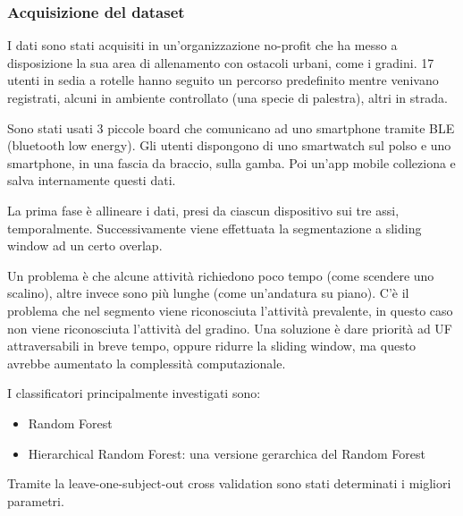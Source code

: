 \subsubsection{Acquisizione del dataset}
I dati sono stati acquisiti in un'organizzazione no-profit che ha messo a disposizione la sua area di allenamento con ostacoli urbani, come i gradini. 
17 utenti in sedia a rotelle hanno seguito un percorso predefinito mentre venivano registrati, alcuni in ambiente controllato (una specie di palestra), altri in strada. 

Sono stati usati 3 piccole board che comunicano ad uno smartphone tramite BLE (bluetooth low energy). 
Gli utenti dispongono di uno smartwatch sul polso e uno smartphone, in una fascia da braccio, sulla gamba. 
Poi un'app mobile colleziona e salva internamente questi dati.

La prima fase è allineare i dati, presi da ciascun dispositivo sui tre assi, temporalmente. 
Successivamente viene effettuata la segmentazione a sliding window ad un certo overlap. 

Un problema è che alcune attività richiedono poco tempo (come scendere uno scalino), altre invece sono più lunghe (come un'andatura su piano).
C'è il problema che nel segmento viene riconosciuta l'attività prevalente, in questo caso non viene riconosciuta l'attività del gradino. 
Una soluzione è dare priorità ad UF attraversabili in breve tempo, oppure ridurre la sliding window, ma questo avrebbe aumentato la complessità computazionale. 

I classificatori principalmente investigati sono:
\begin{itemize}
    \item Random Forest
    \item Hierarchical Random Forest: una versione gerarchica del Random Forest
\end{itemize}

Tramite la leave-one-subject-out cross validation sono stati determinati i migliori parametri.

